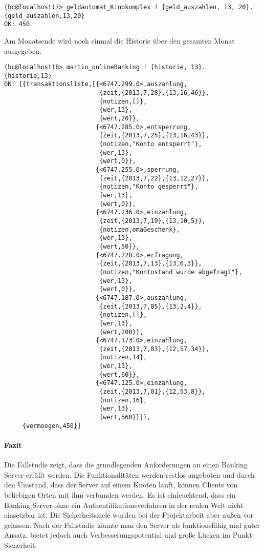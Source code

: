 \begin{lstlisting}
(bc@localhost)7> geldautomat_Kinokomplex ! {geld_auszahlen, 13, 20}.
{geld_auszahlen,13,20}
OK: 450  
\end{lstlisting}
Am Monatsende wird noch einmal die Historie über den gesamten Monat ausgegeben. 
\begin{lstlisting}
(bc@localhost)8> martin_onlineBanking ! {historie, 13}.                   
{historie,13}
OK: [{transaktionsliste,[{<6747.299.0>,auszahlung,
                          {zeit,{2013,7,28},{13,16,46}},
                          {notizen,[]},
                          {wer,13},
                          {wert,20}},
                         {<6747.285.0>,entsperrung,
                          {zeit,{2013,7,25},{13,16,43}},
                          {notizen,"Konto entsperrt"},
                          {wer,13},
                          {wert,0}},
                         {<6747.255.0>,sperrung,
                          {zeit,{2013,7,22},{13,12,27}},
                          {notizen,"Konto gesperrt"},
                          {wer,13},
                          {wert,0}},
                         {<6747.236.0>,einzahlung,
                          {zeit,{2013,7,19},{13,10,5}},
                          {notizen,omaGeschenk},
                          {wer,13},
                          {wert,50}},
                         {<6747.228.0>,erfragung,
                          {zeit,{2013,7,13},{13,6,3}},
                          {notizen,"Kontostand wurde abgefragt"},
                          {wer,13},
                          {wert,0}},
                         {<6747.187.0>,auszahlung,
                          {zeit,{2013,7,05},{13,2,4}},
                          {notizen,[]},
                          {wer,13},
                          {wert,200}},
                         {<6747.173.0>,einzahlung,
                          {zeit,{2013,7,03},{12,57,34}},
                          {notizen,14},
                          {wer,13},
                          {wert,60}},
                         {<6747.125.0>,einzahlung,
                          {zeit,{2013,7,01},{12,53,8}},
                          {notizen,16},
                          {wer,13},
                          {wert,560}}]},
     {vermoegen,450}]
\end{lstlisting}
\paragraph{Fazit}
Die Fallstudie zeigt, dass die grundlegenden Anforderungen an einen Banking Server erfüllt werden. Die Funktionalitäten werden restlos angeboten und durch den Umstand, dass der Server auf einem Knoten läuft, können Clients von beliebigen Orten mit ihm verbunden werden. Es ist einleuchtend, dass ein Banking Server ohne ein Authentifikationsverfahren in der realen Welt nicht einsetzbar ist. Die Sicherheitsziele wurden bei der Projektarbeit aber außen vor gelassen. Nach der Fallstudie könnte man den Server als funktionsfähig und guter Ansatz, bietet jedoch auch Verbesserungspotential und große Lücken im Punkt Sicherheit.
